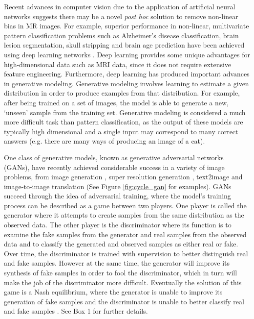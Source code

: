 Recent advances in computer vision due to the application of artificial neural networks suggests there may be a novel \textit{post hoc} solution  to remove non-linear bias in MR images. For example, superior performance in non-linear, multivariate pattern classification problems such as Alzheimer’s disease classification, brain lesion segmentation, skull stripping and brain age prediction have been achieved using deep learning networks \citep{payan2015predicting, sarraf2016deepad, kamnitsas2017efficient, kleesiek2016deep, cole2017predicting}. Deep learning provides some unique advantages for high-dimensional data such as MRI data, since it does not require extensive feature engineering. Furthermore, deep learning has produced important advances in generative modeling. Generative modeling involves learning to estimate a given distribution in order to produce examples from that distribution. For example, after being trained on a set of images, the model is able to generate a new, `unseen’ sample from the training set. Generative modeling is considered a much more difficult task than pattern classification, as the output of these models are typically high dimensional and a single input may correspond to many correct answers (e.g. there are many ways of producing an image of a cat).

One class of generative models, known as generative adversarial networks (GANs), have recently achieved considerable success in a variety of image problems, from image generation \citep{radford2015unsupervised}, super resolution generation \citep{ledig2016photo}, text2image \citep{reed2016generative} and image-to-image translation \citep{isola2016image} (See Figure \ref{fig:cycle_gan} for examples). GANs succeed through the idea of adversarial training, where the model’s training process can be described as a game between two players. One player is called the generator where it attempts to create samples from the same distribution as the observed data. The other player is the discriminator where its function is to examine the fake samples from the generator and real samples from the observed data and to classify the generated and observed samples as either real or fake. Over time, the discriminator is trained with supervision to better distinguish real and fake samples. However at the same time, the generator will improve its synthesis of fake samples in order to fool the discriminator, which in turn will make the job of the discriminator more difficult. Eventually the solution of this game is a Nash equilibrium, where the generator is unable to improve its generation of fake samples and the discriminator is unable to better classify real and fake samples \citep{goodfellow2016nips}. See Box 1 for further details.

